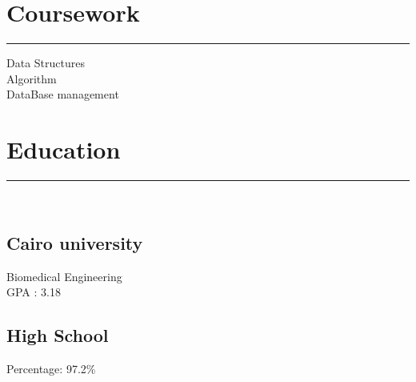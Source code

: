 \documentclass[]{rahulworld-resume}
\begin{document}
\begin{minipage}[t]{0.33\textwidth}
\section{Coursework}
\noindent\rule{5cm}{0.4pt}

Data Structures\\
Algorithm\\
DataBase management\\

\sectionsep
\section{Education} 
\noindent\rule{5cm}{0.4pt}\\
\subsection{Cairo university}
Biomedical Engineering \\
GPA : 3.18\\
\vspace{8pt}
\subsection{High School}
Percentage: 97.2\%
\sectionsep
%
%

\end{minipage} 
\hfill
\end{document}
